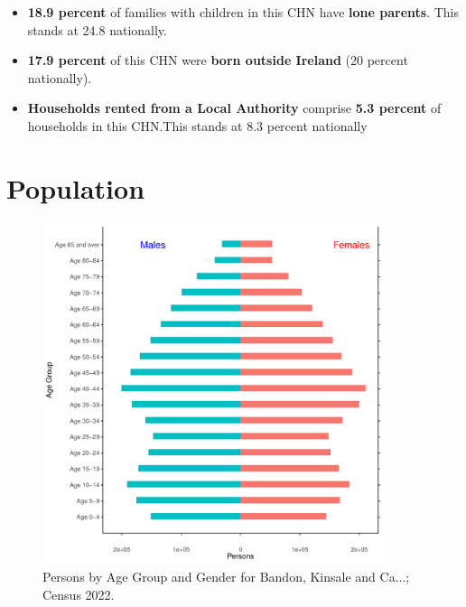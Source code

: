 \documentclass{article}
\begin{document}
\begin{itemize}
\item \textbf{18.9 percent} of families with children in this CHN have \textbf{lone parents}. This stands at 24.8 nationally.

\item \textbf{17.9 percent} of this CHN were \textbf{born outside Ireland} (20 percent nationally).

\item \textbf{Households rented from a Local Authority} comprise \textbf{5.3 percent} of households in this CHN.This stands at 8.3 percent nationally

\end{itemize}

\pagebreak

\section{Population} 
\label{sect:Pop}

\begin{figure}[h]
	\centering
	\includegraphics[width = 100mm]{../figures/PyramidPlot.pdf}
	\caption{Persons by Age Group and Gender for Bandon, Kinsale and Ca...; Census 2022.}
	\label{fig:2ae19629-1a6a-13a3-e055-000000000001}
	\end{figure}
\end{document}
